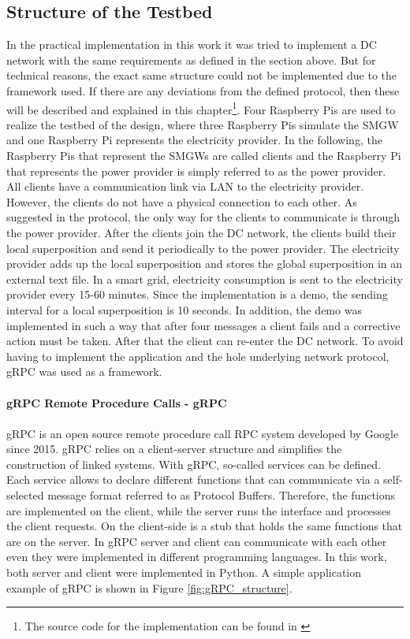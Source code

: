 \subsection{Structure of the Testbed}
In the practical implementation in this work it was tried to implement a DC network with the same requirements as defined in the section above. But for technical reasons, the exact same structure could not be implemented due to the framework used. If there are any deviations from the defined protocol, then these will be described and explained in this chapter\footnote[5]{The source code for the implementation can be found in \cite{Impl}}.
Four Raspberry Pis are used to realize the testbed of the design, where three Raspberry Pis simulate the \gls{SMGW} and one Raspberry Pi represents the electricity provider. In the following, the Raspberry Pis that represent the \gls{SMGW}s are called clients and the Raspberry Pi that represents the power provider is simply referred to as the power provider. All clients have a communication link via \gls{LAN} to the electricity provider. However, the clients do not have a physical connection to each other. As suggested in the protocol, the only way for the clients to communicate is through the power provider. After the clients join the DC network, the clients build their local superposition and send it periodically to the power provider. The electricity provider adds up the local superposition and stores the global superposition in an external text file. In a smart grid, electricity consumption is sent to the electricity provider every 15-60 minutes. Since the implementation is a demo, the sending interval for a local superposition is 10 seconds. In addition, the demo was implemented in such a way that after four messages a client fails and a corrective action must be taken. After that the client can re-enter the DC network. To avoid having to implement the application and the hole underlying network protocol, gRPC was used as a framework.\\
\\
\textbf{gRPC Remote Procedure Calls - gRPC}
\\
\\
gRPC \cite{gRPC} is an open source remote procedure call \gls{RPC} system developed by Google since 2015. gRPC relies on a client-server structure and simplifies the construction of linked systems. With gRPC, so-called services can be defined. Each service allows to declare different functions that can communicate via a self-selected message format referred to as Protocol Buffers. Therefore, the functions are implemented on the client, while the server runs the interface and processes the client requests. On the client-side is a stub that holds the same functions that are on the server. In gRPC server and client can communicate with each other even they were implemented in different programming languages. In this work, both server and client were implemented in Python. A simple application example of gRPC is shown in Figure \ref{fig:gRPC_structure}.
